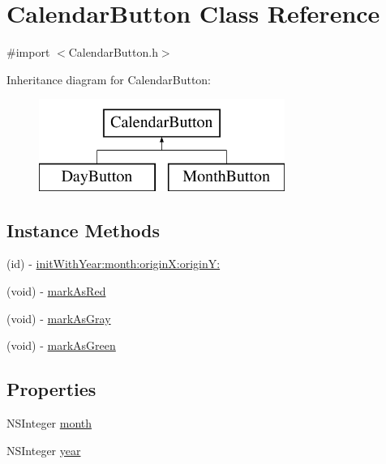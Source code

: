 \hypertarget{interface_calendar_button}{\section{Calendar\+Button Class Reference}
\label{interface_calendar_button}
}


{\ttfamily \#import $<$Calendar\+Button.\+h$>$}

Inheritance diagram for Calendar\+Button\+:\begin{figure}[H]
\begin{center}
\leavevmode
\includegraphics[height=3.000000cm]{interface_calendar_button}
\end{center}
\end{figure}
\subsection*{Instance Methods}
\begin{DoxyCompactItemize}
\item 
(id) -\/ \hyperlink{interface_calendar_button_a575053cfafe6a9790ff7b823e67cdd8f}{init\+With\+Year\+:month\+:origin\+X\+:origin\+Y\+:}
\item 
(void) -\/ \hyperlink{interface_calendar_button_ac19bd8ddd5723e4700bfd15bc31791e6}{mark\+As\+Red}
\item 
(void) -\/ \hyperlink{interface_calendar_button_a588a452598d23eeeeb201003fbab896e}{mark\+As\+Gray}
\item 
(void) -\/ \hyperlink{interface_calendar_button_adb8abbee02c42e396d6d23eb61bd9d1f}{mark\+As\+Green}
\end{DoxyCompactItemize}
\subsection*{Properties}
\begin{DoxyCompactItemize}
\item 
N\+S\+Integer \hyperlink{interface_calendar_button_a0376fff10e4b7543fda1c00b81585828}{month}
\item 
N\+S\+Integer \hyperlink{interface_calendar_button_ad84a0f3277c87c767e149d4498bb94b2}{year}
\end{DoxyCompactItemize}



